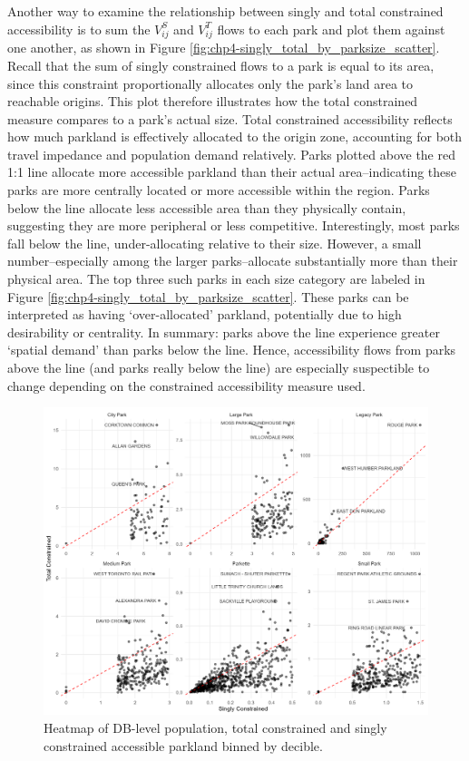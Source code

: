 \documentclass[
11pt, %
oneside, %
english, %
singlespacing, %
]{macthesis} %
\begin{document}
Another way to examine the relationship between singly and total constrained accessibility is to sum the \(V_{ij}^S\) and \(V_{ij}^T\) flows to each park and plot them against one another, as shown in Figure \ref{fig:chp4-singly_total_by_parksize_scatter}. Recall that the sum of singly constrained flows to a park is equal to its area, since this constraint proportionally allocates only the park's land area to reachable origins. This plot therefore illustrates how the total constrained measure compares to a park's actual size. Total constrained accessibility reflects how much parkland is effectively allocated to the origin zone, accounting for both travel impedance and population demand relatively. Parks plotted above the red 1:1 line allocate more accessible parkland than their actual area--indicating these parks are more centrally located or more accessible within the region. Parks below the line allocate less accessible area than they physically contain, suggesting they are more peripheral or less competitive. Interestingly, most parks fall below the line, under-allocating relative to their size. However, a small number--especially among the larger parks--allocate substantially more than their physical area. The top three such parks in each size category are labeled in Figure \ref{fig:chp4-singly_total_by_parksize_scatter}. These parks can be interpreted as having `over-allocated' parkland, potentially due to high desirability or centrality. In summary: parks above the line experience greater `spatial demand' than parks below the line. Hence, accessibility flows from parks above the line (and parks really below the line) are especially suspectible to change depending on the constrained accessibility measure used.

\begin{figure}

{\centering \includegraphics[width=6in]{./data/figures/chp4-singly_total_by_parksize_scatter} 

}

\caption{\label{fig:chp4-singly_total_by_parksize_scatter}Heatmap of DB-level population, total constrained and singly constrained accessible parkland binned by decible.}\label{fig:unnamed-chunk-58}
\end{figure}
\end{document}
